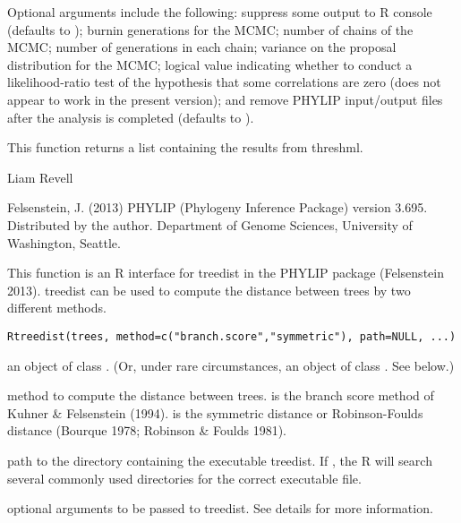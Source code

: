 \documentclass[a4paper]{book}
\begin{document}
%
\begin{Details}\relax
Optional arguments include the following:  suppress some output to R console (defaults to );  burnin generations for the MCMC;  number of chains of the MCMC;  number of generations in each chain;  variance on the proposal distribution for the MCMC;  logical value indicating whether to conduct a likelihood-ratio test of the hypothesis that some correlations are zero (does not appear to work in the present version); and  remove PHYLIP input/output files after the analysis is completed (defaults to ).
\end{Details}
%
\begin{Value}
This function returns a list containing the results from threshml.
\end{Value}
%
\begin{Author}\relax
Liam Revell 
\end{Author}
%
\begin{References}\relax

Felsenstein, J. (2013) PHYLIP (Phylogeny Inference Package) version 3.695. Distributed by the author. Department of Genome Sciences, University of Washington, Seattle.
\end{References}
%
\begin{SeeAlso}\relax
{}
\end{SeeAlso}
%
\begin{Description}\relax
This function is an R interface for treedist in the PHYLIP package (Felsenstein 2013). treedist can be used to compute the distance between trees by two different methods.
\end{Description}
%
\begin{Usage}
\begin{verbatim}
Rtreedist(trees, method=c("branch.score","symmetric"), path=NULL, ...)
\end{verbatim}
\end{Usage}
%
\begin{Arguments}
\begin{ldescription}
\item[\code{trees}] an object of class . (Or, under rare circumstances, an object of class . See below.)
\item[\code{method}] method to compute the distance between trees.  is the branch score method of Kuhner \& Felsenstein (1994).  is the symmetric distance or Robinson-Foulds distance (Bourque 1978; Robinson \& Foulds 1981).
\item[\code{path}] path to the directory containing the executable treedist. If , the R will search several commonly used directories for the correct executable file.
\item[\code{...}] optional arguments to be passed to treedist. See details for more information.
\end{ldescription}
\end{Arguments}
\end{document}
